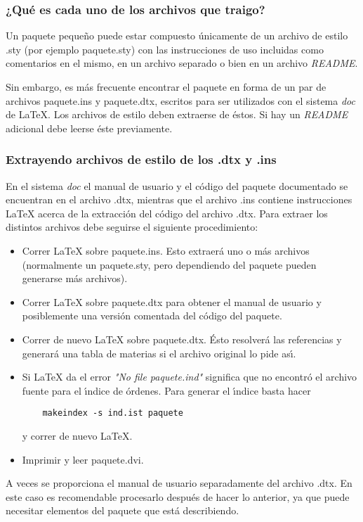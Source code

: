 	\subsubsection{¿Qu\'e es cada uno de los archivos que traigo?}

	Un paquete peque\~no puede estar compuesto \'unicamente de un archivo de estilo
	{\ttfamily .sty} (por ejemplo {\ttfamily paquete.sty}) con las instrucciones de uso
	incluidas como comentarios en el mismo, en un archivo separado o bien en un
	archivo {\itshape README\/}.

	Sin embargo, es m\'as frecuente encontrar el paquete en forma de un par de
	archivos {\ttfamily paquete.ins} y {\ttfamily paquete.dtx}, escritos para ser utilizados con
	el sistema {\itshape doc\/} de \LaTeX{}. Los archivos de estilo deben extraerse de
	\'estos. Si hay un {\itshape README\/} adicional debe leerse \'este previamente.

	\subsubsection{Extrayendo archivos de estilo de los {\ttfamily .dtx} y {\ttfamily .ins}\label{dtx-extraer}}

	En el sistema {\itshape doc\/} el manual de usuario y el c\'odigo del paquete
	documentado se encuentran en el archivo {\ttfamily .dtx}, mientras que el archivo
	{\ttfamily .ins} contiene instrucciones \LaTeX{} acerca de la extracci\'on del c\'odigo
	del archivo {\ttfamily .dtx}. Para extraer los distintos archivos debe seguirse el
	siguiente procedimiento:
	\begin{itemize}
	\item Correr \LaTeX{} sobre {\ttfamily paquete.ins}. Esto extraer\'a uno o m\'as archivos
	(normalmente un {\ttfamily paquete.sty}, pero dependiendo del paquete pueden
	generarse m\'as archivos).
	\item Correr \LaTeX{} sobre {\ttfamily paquete.dtx} para obtener el manual de usuario y
	posiblemente una versi\'on comentada del c\'odigo del paquete.
	\item Correr de nuevo \LaTeX{} sobre {\ttfamily paquete.dtx}. \'Esto resolver\'a las
	referencias y generar\'a una tabla de materias si el archivo original lo pide
	as\'\i{}.
	\item Si \LaTeX{} da el error {\itshape "No file paquete.ind"\/} significa que no encontr\'o
	el archivo fuente para el \'\i{}ndice de \'ordenes. Para generar el \'\i{}ndice basta
	hacer
	\begin{verbatim}
	makeindex -s ind.ist paquete
	\end{verbatim}
 	y correr de nuevo \LaTeX{}.
	\item  Imprimir y leer {\ttfamily paquete.dvi}.
	\end{itemize}
 	A veces se proporciona el manual de usuario separadamente del archivo
	{\ttfamily .dtx}. En este caso es recomendable procesarlo despu\'es de hacer lo
	anterior, ya que puede necesitar elementos del paquete que est\'a describiendo.

